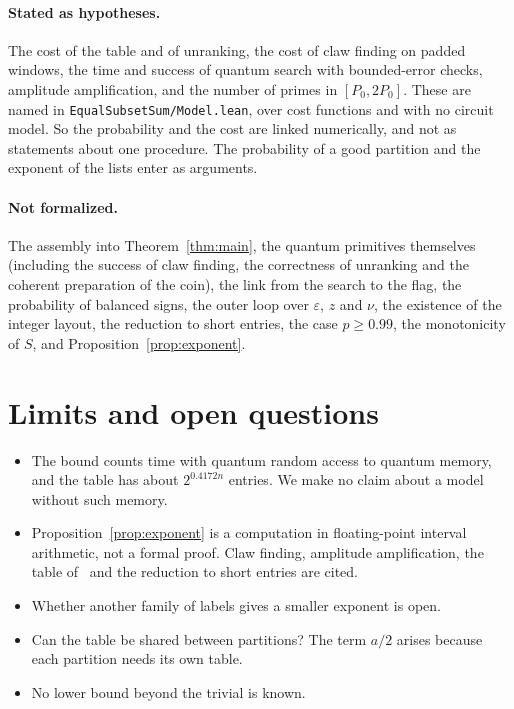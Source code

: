 \documentclass[11pt]{article}
\theoremstyle{remark}
\begin{document}
\paragraph{Stated as hypotheses.} The cost of the table and of unranking, the cost of claw finding on padded windows, the time and success of quantum search with bounded-error checks, amplitude amplification, and the number of primes in $[P_0,2P_0]$. These are named in \texttt{EqualSubsetSum/Model.lean}, over cost functions and with no circuit model. So the probability and the cost are linked numerically, and not as statements about one procedure. The probability of a good partition and the exponent of the lists enter as arguments.

\paragraph{Not formalized.} The assembly into Theorem~\ref{thm:main}, the quantum primitives themselves (including the success of claw finding, the correctness of unranking and the coherent preparation of the coin), the link from the search to the flag, the probability of balanced signs, the outer loop over $\varepsilon$, $z$ and $\nu$, the existence of the integer layout, the reduction to short entries, the case $p\ge0.99$, the monotonicity of $S$, and Proposition~\ref{prop:exponent}.

\section{Limits and open questions}

\begin{itemize}[leftmargin=1.5em]
\item The bound counts time with quantum random access to quantum memory, and the table has about $2^{0.4172n}$ entries. We make no claim about a model without such memory.
\item Proposition~\ref{prop:exponent} is a computation in floating-point interval arithmetic, not a formal proof. Claw finding, amplitude amplification, the table of~\cite{AHJKS22} and the reduction to short entries are cited.
\item Whether another family of labels gives a smaller exponent is open.
\item Can the table be shared between partitions? The term $a/2$ arises because each partition needs its own table.
\item No lower bound beyond the trivial is known.
\end{itemize}
\end{document}
